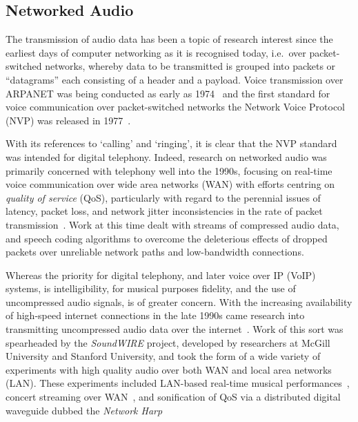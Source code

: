 \subsection{Networked Audio}\label{subsec:networked-audio}

The transmission of audio data has been a topic of research interest since the
earliest days of computer networking as it is recognised today, i.e.\ over
packet-switched networks, whereby data to be transmitted is grouped into
packets \textemdash{} or ``datagrams'' \textemdash{} each consisting of a header
and a payload.
Voice transmission over ARPANET was being conducted as early as
1974~\citep{schulzrinne_voice_1992} and the first standard for voice
communication over packet-switched networks \textemdash{} the Network Voice
Protocol (NVP) \textemdash{} was released in
1977~\citep{cohen_specifications_1977}.

With its references to `calling' and `ringing', it is clear that the NVP
standard was intended for digital telephony.
Indeed, research on networked audio was primarily concerned with telephony well
into the 1990s, focusing on real-time voice communication over wide area
networks (WAN) with efforts centring on \textit{quality of service} (QoS),
particularly with regard to the perennial issues of latency, packet loss, and
network jitter \textemdash{} inconsistencies in the rate of packet
transmission~\citep{hardman_reliable_1995,hardman_successful_1998}.
Work at this time dealt with streams of compressed audio data, and speech
coding algorithms to overcome the deleterious effects of dropped packets over
unreliable network paths and low-bandwidth connections.

Whereas the priority for digital telephony, and later voice over IP (VoIP)
systems, is intelligibility, for musical purposes fidelity, and the use of
uncompressed audio signals, is of greater concern.
With the increasing availability of high-speed internet connections in the late
1990s came research into transmitting uncompressed audio data over the
internet~\citep{chafe_simplified_2000,xu_real-time_2000}.
Work of this sort was spearheaded by the \textit{SoundWIRE} project, developed
by researchers at McGill University and Stanford University, and took the form
of a wide variety of experiments with high quality audio over both WAN and local
area networks (LAN).
These experiments included LAN-based real-time musical
performances~\citep{chafe_simplified_2000}, concert streaming over
WAN~\citep{xu_real-time_2000,chafe_simplified_2000}, and sonification of QoS via
a distributed digital waveguide dubbed the
\textit{Network Harp}~\citep{chafe_simplified_2000,chafe_physical_2002}

